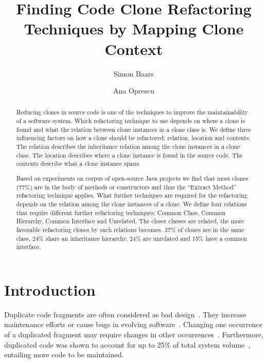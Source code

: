 \documentclass[runningheads]{llncs}
\begin{document}
\title{Finding Code Clone Refactoring Techniques by Mapping Clone Context}

\author{Simon Baars \and
Ana Oprescu}

\maketitle

\begin{abstract}
Reducing clones in source code is one of the techniques to improve the maintainability of a software system. Which refactoring technique to use depends on where a clone is found and what the relation between clone instances in a clone class is. We define three influencing factors on how a clone should be refactored: relation, location and contents. The relation describes the inheritance relation among the clone instances in a clone class. The location describes where a clone instance is found in the source code. The contents describe what a clone instance spans.

Based on experiments on corpus of open-source Java projects we find that most clones (77\%) are in the body of methods or constructors and thus the ``Extract Method'' refactoring technique applies. What further techniques are required for the refactoring depends on the relation among the clone instances of a clone. We define four relations that require different further refactoring techniques: Common Class, Common Hierarchy, Common Interface and Unrelated. The closer classes are related, the more favorable refactoring clones by such relations becomes. 37\% of clones are in the same class, 24\% share an inheritance hierarchy, 24\% are unrelated and 15\% have a common interface.

\end{abstract}

\section{Introduction}
Duplicate code fragments are often considered as bad design~\cite{fowler2018refactoring}. They increase maintenance efforts or cause bugs in evolving software~\cite{heitlager2007practical}. Changing one occurrence of a duplicated fragment may require changes in other occurrences~\cite{ostberg2014automatically}. Furthermore, duplicated code was shown to account for up to 25\% of total system volume~\cite{bruntink2005use}, entailing more code to be maintained.
\end{document}

